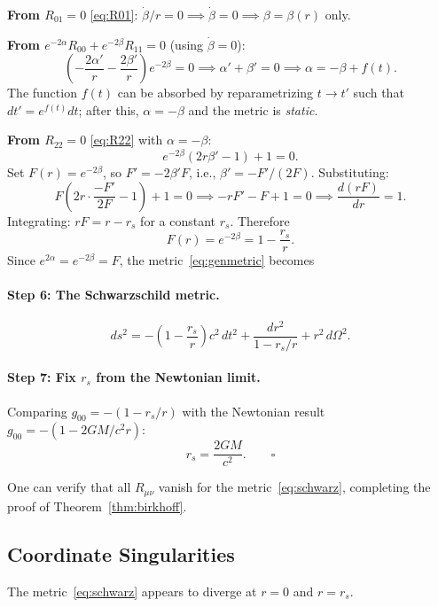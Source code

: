 \documentclass[12pt,a4paper]{article}
\theoremstyle{plain}
\theoremstyle{definition}
\theoremstyle{remark}
\begin{document}
\textbf{From $R_{01}=0$} \eqref{eq:R01}: $\dot\beta/r=0\implies\dot\beta=0\implies\beta=\beta(r)$ only.

\textbf{From $e^{-2\alpha}R_{00}+e^{-2\beta}R_{11}=0$} (using $\dot\beta=0$):
\[
  \left(-\frac{2\alpha'}{r}-\frac{2\beta'}{r}\right)e^{-2\beta} = 0
  \implies \alpha'+\beta'=0
  \implies \alpha = -\beta + f(t).
\]
The function $f(t)$ can be absorbed by reparametrizing $t\to t'$ such that $dt' = e^{f(t)}dt$; after this, $\alpha = -\beta$ and the metric is \textit{static}.

\textbf{From $R_{22}=0$} \eqref{eq:R22} with $\alpha=-\beta$:
\[
  e^{-2\beta}(2r\beta'-1)+1=0.
\]
Set $F(r)=e^{-2\beta}$, so $F'=-2\beta'F$, i.e., $\beta'=-F'/(2F)$. Substituting:
\[
  F\!\left(2r\cdot\frac{-F'}{2F}-1\right)+1=0
  \implies -rF'-F+1=0
  \implies \frac{d(rF)}{dr} = 1.
\]
Integrating: $rF = r - r_s$ for a constant $r_s$. Therefore
\[
  F(r) = e^{-2\beta} = 1-\frac{r_s}{r}.
\]
Since $e^{2\alpha}=e^{-2\beta}=F$, the metric~\eqref{eq:genmetric} becomes

\paragraph{Step 6: The Schwarzschild metric.}
\begin{equation}\label{eq:schwarz}
  \boxed{
    ds^2 = -\!\left(1-\frac{r_s}{r}\right)c^2\,dt^2
         + \frac{dr^2}{1-r_s/r}
         + r^2\,d\Omega^2.
  }
\end{equation}

\paragraph{Step 7: Fix $r_s$ from the Newtonian limit.}
Comparing $g_{00}=-(1-r_s/r)$ with the Newtonian result $g_{00}=-(1-2GM/c^2r)$:
\[
  \boxed{r_s = \frac{2GM}{c^2}.} \qquad\square
\]

One can verify that all $R_{\mu\nu}$ vanish for the metric~\eqref{eq:schwarz}, completing the proof of Theorem~\ref{thm:birkhoff}.

\subsection{Coordinate Singularities}

The metric~\eqref{eq:schwarz} appears to diverge at $r=0$ and $r=r_s$.
\end{document}
